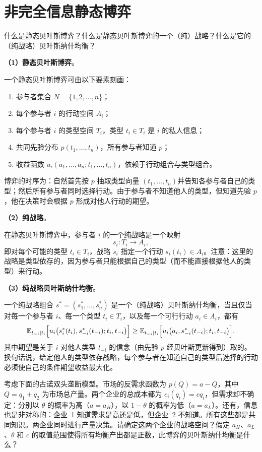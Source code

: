 \chapter{非完全信息静态博弈}\label{chap:03}

什么是静态贝叶斯博弈？什么是静态贝叶斯博弈的一个（纯）战略？什么是它的（纯战略）贝叶斯纳什均衡？

\sol

\textbf{（1）静态贝叶斯博弈}。

一个静态贝叶斯博弈可由以下要素刻画：
\begin{enumerate}[nosep]
\item 参与者集合 $N=\{1,2,\dots,n\}$；
\item 每个参与者 $i$ 的行动空间 $A_i$；
\item 每个参与者 $i$ 的类型空间 $T_i$，类型 $t_i\in T_i$ 是 $i$ 的私人信息；
\item 共同先验分布 $p(t_1,\dots,t_n)$，所有参与者知道 $p$；
\item 收益函数 $u_i(a_1,\dots,a_n;t_1,\dots,t_n)$，依赖于行动组合与类型组合。
\end{enumerate}
博弈的时序为：自然首先按 $p$ 抽取类型向量 $(t_1,\dots,t_n)$并告知各参与者自己的类型；然后所有参与者同时选择行动。由于参与者不知道他人的类型，但知道先验 $p$，他在决策时会根据 $p$ 形成对他人行动的期望。

\textbf{（2）纯战略}。

在静态贝叶斯博弈中，参与者 $i$ 的一个纯战略是一个映射
\[
	s_i:T_i\to A_i,
\]\indent
即对每个可能的类型 $t_i\in T_i$，战略 $s_i$ 指定一个行动 $s_i(t_i)\in A_i$。注意：这里的战略是类型依存的，因为参与者只能根据自己的类型（而不能直接根据他人的类型）来行动。

\textbf{（3）纯战略贝叶斯纳什均衡}。

一个纯战略组合 $s^*=(s_1^*,\dots,s_n^*)$ 是一个（纯战略）贝叶斯纳什均衡，当且仅当对每一个参与者 $i$、每一个类型 $t_i\in T_i$，以及每一个可行行动 $a_i\in A_i$，都有
\[
	\mathbb{E}_{t_{-i}\mid t_i}\Bigl[u_i\bigl(s_i^*(t_i),s_{-i}^*(t_{-i});t_i,t_{-i}\bigr)\Bigr]
	\ge
	\mathbb{E}_{t_{-i}\mid t_i}\Bigl[u_i\bigl(a_i,s_{-i}^*(t_{-i});t_i,t_{-i}\bigr)\Bigr].
\]\indent
其中期望是关于 $i$ 对他人类型 $t_{-i}$ 的信念（由先验 $p$ 经贝叶斯更新得到）取的。换句话说，给定他人的类型依存战略，每个参与者在知道自己的类型后选择的行动必须使自己的条件期望收益最大化。


考虑下面的古诺双头垄断模型。市场的反需求函数为 $p(Q)=a-Q$，其中 $Q=q_1+q_2$ 为市场总产量。两个企业的总成本都为 $c_i(q_i)=cq_i$，但需求却不确定：分别以 $\theta$ 的概率为高（$a=a_H$），以 $1-\theta$ 的概率为低（$a=a_L$）。还有，信息也是非对称的：企业~1 知道需求是高还是低，但企业~2 不知道。所有这些都是共同知识。两企业同时进行产量决策。请确定这两个企业的战略空间？假定 $a_H$、$a_L$、$\theta$ 和 $c$ 的取值范围使得所有均衡产出都是正数，此博弈的贝叶斯纳什均衡是什么？

